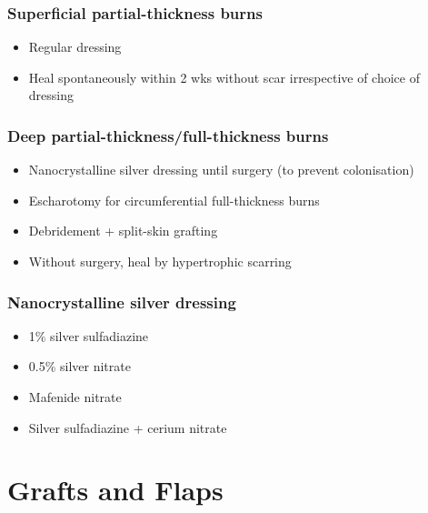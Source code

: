 \documentclass[
  14pt,
]{extarticle}
\providecommand{\tightlist}{%
  \setlength{\itemsep}{0pt}\setlength{\parskip}{0pt}}
\begin{document}
\hypertarget{superficial-partial-thickness-burns}{%
\subsubsection{Superficial partial-thickness
burns}\label{superficial-partial-thickness-burns}}

\begin{itemize}
\tightlist
\item
  Regular dressing
\item
  Heal spontaneously within 2 wks without scar irrespective of choice of
  dressing
\end{itemize}

\hypertarget{deep-partial-thicknessfull-thickness-burns}{%
\subsubsection{Deep partial-thickness/full-thickness
burns}\label{deep-partial-thicknessfull-thickness-burns}}

\begin{itemize}
\tightlist
\item
  Nanocrystalline silver dressing until surgery (to prevent
  colonisation)
\item
  Escharotomy for circumferential full-thickness burns
\item
  Debridement + split-skin grafting
\item
  Without surgery, heal by hypertrophic scarring
\end{itemize}

\hypertarget{nanocrystalline-silver-dressing}{%
\subsubsection{Nanocrystalline silver
dressing}\label{nanocrystalline-silver-dressing}}

\begin{itemize}
\tightlist
\item
  1\% silver sulfadiazine
\item
  0.5\% silver nitrate
\item
  Mafenide nitrate
\item
  Silver sulfadiazine + cerium nitrate
\end{itemize}

\pagebreak

\hypertarget{grafts-and-flaps}{%
\section{Grafts and Flaps}\label{grafts-and-flaps}}
\end{document}
